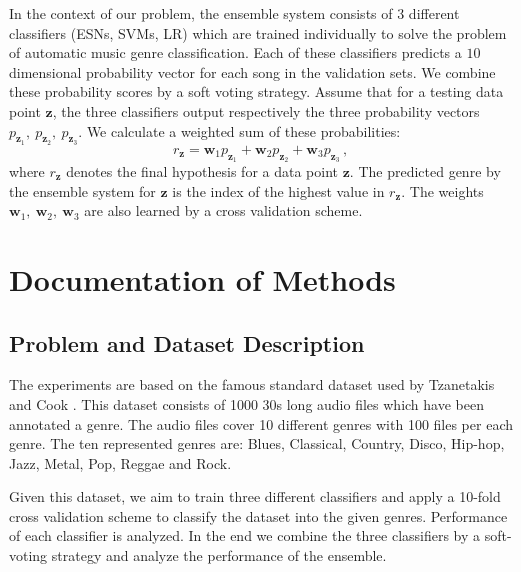 \documentclass[a4paper,11pt,oneside]{article}
\begin{document}
In the context of our problem, the ensemble system consists of 3 different classifiers (ESNs, SVMs, LR) 
which are trained individually to solve the problem of automatic music genre classification. 
Each of these classifiers predicts a $10$ dimensional probability vector for each song in the validation sets.
We combine these probability scores by a soft voting strategy. Assume that for a testing data point $\mathbf{z}$,
the three classifiers output respectively the three probability vectors $p_{\mathbf{z}_1},\ p_{\mathbf{z}_2},\ p_{\mathbf{z}_3}$.
We calculate a weighted sum of these probabilities:
\begin{equation}
  r_\mathbf{z} = \mathbf{w}_1p_{\mathbf{z}_1} + \mathbf{w}_2p_{\mathbf{z}_2} + \mathbf{w}_3p_{\mathbf{z}_3}\,,
\end{equation}
where $r_\mathbf{z}$ denotes the final hypothesis for a data point $\mathbf{z}$. The predicted genre by the ensemble
system for $\mathbf{z}$ is the index of the highest value in $r_\mathbf{z}$. The weights $\mathbf{w}_1,\
\mathbf{w}_2,\ \mathbf{w}_3$ are also learned by a cross validation scheme.

\section{Documentation of Methods}
\subsection{Problem and Dataset Description}
The experiments are based on the famous standard dataset used by Tzanetakis and Cook \cite{tzan}.
This dataset consists of 1000 30s long audio files which have been annotated a genre. 
The audio files cover 10 different genres with 100 files per each genre. The ten represented genres
are: Blues, Classical, Country, Disco, Hip-hop, Jazz, Metal, Pop, Reggae and Rock.

Given this dataset, we aim to train three different classifiers and apply a 10-fold 
cross validation scheme to classify the dataset into the given genres. Performance of 
each classifier is analyzed. In the end we combine the three classifiers by a soft-voting 
strategy and analyze the performance of the ensemble. 
\end{document}
